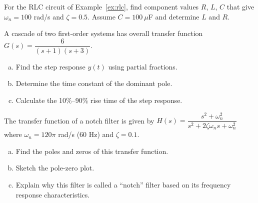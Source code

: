 \begin{exercise}
For the RLC circuit of Example~\ref{ex:rlc}, find component values $R$, $L$, $C$ that give $\omega_n = 100$ rad/s and $\zeta = 0.5$. Assume $C = 100\ \mu$F and determine $L$ and $R$.
\end{exercise}

\begin{exercise}
A cascade of two first-order systems has overall transfer function $G(s) = \dfrac{6}{(s+1)(s+3)}$.
\begin{enumerate}[(a)]
    \item Find the step response $y(t)$ using partial fractions.
    \item Determine the time constant of the dominant pole.
    \item Calculate the 10\%--90\% rise time of the step response.
\end{enumerate}
\end{exercise}

\begin{exercise}
The transfer function of a notch filter is given by $H(s) = \dfrac{s^2 + \omega_n^2}{s^2 + 2\zeta\omega_n s + \omega_n^2}$ where $\omega_n = 120\pi$ rad/s (60 Hz) and $\zeta = 0.1$.
\begin{enumerate}[(a)]
    \item Find the poles and zeros of this transfer function.
    \item Sketch the pole-zero plot.
    \item Explain why this filter is called a ``notch'' filter based on its frequency response characteristics.
\end{enumerate}
\end{exercise}


